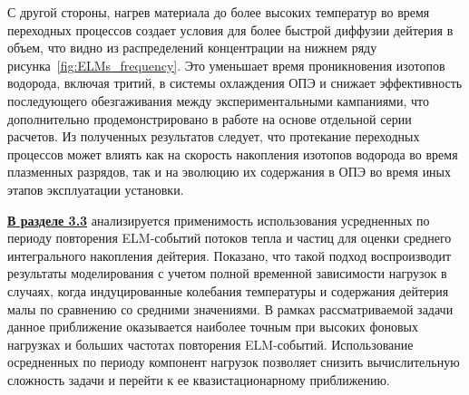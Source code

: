 С другой стороны, нагрев материала до более высоких температур во время переходных процессов создает условия для более быстрой диффузии дейтерия в объем, что видно из распределений концентрации на нижнем ряду рисунка~\cref{fig:ELMs_frequency}. Это уменьшает время проникновения изотопов водорода, включая тритий, в системы охлаждения ОПЭ и снижает эффективность последующего обезгаживания между экспериментальными кампаниями, что дополнительно продемонстрировано в работе на основе отдельной серии расчетов. Из полученных результатов следует, что протекание переходных процессов может влиять как на скорость накопления изотопов водорода во время плазменных разрядов, так и на эволюцию их содержания в ОПЭ во время иных этапов эксплуатации установки.

\underline{\textbf{В разделе 3.3}} анализируется применимость использования усредненных по периоду повторения ELM-событий потоков тепла и частиц для оценки среднего интегрального накопления дейтерия. Показано, что такой подход воспроизводит результаты моделирования с учетом полной временной зависимости нагрузок в случаях, когда индуцированные колебания температуры и содержания дейтерия малы по сравнению со средними значениями. В рамках рассматриваемой задачи данное приближение оказывается наиболее точным при высоких фоновых нагрузках и больших частотах повторения ELM-событий. Использование осредненных по периоду компонент нагрузок позволяет снизить вычислительную сложность задачи и перейти к ее квазистационарному приближению.

